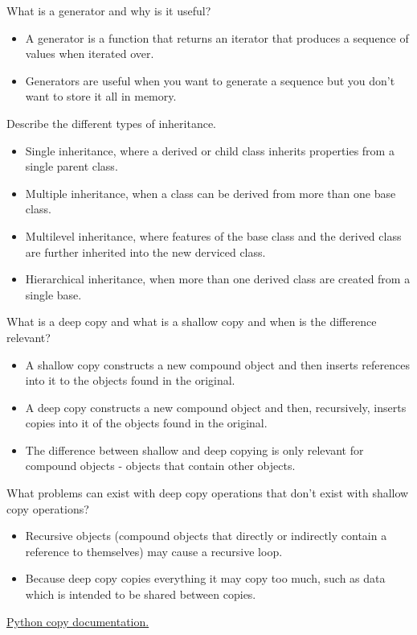 \begin{questions}
\question What is a generator and why is it useful?
\begin{solution}
\begin{itemize}
    \item A generator is a function that returns an iterator that produces a sequence of values when iterated over.
    \item Generators are useful when you want to generate a sequence but you don't want to store it all in memory.
\end{itemize}
\end{solution}

\question[4] Describe the different types of inheritance.
\begin{solution}
\begin{itemize}
    \item Single inheritance, where a derived or child class inherits properties from a single parent class.
    \item Multiple inheritance, when a class can be derived from more than one base class.
    \item Multilevel inheritance, where features of the base class and the derived class are further inherited into the new derviced class.
    \item Hierarchical inheritance, when more than one derived class are created from a single base.
\end{itemize}
\end{solution}

\question[3] What is a deep copy and what is a shallow copy and when is the difference relevant?
\begin{solution}
\begin{itemize}
    \item A shallow copy constructs a new compound object and then inserts references into it to the objects found in the original.
    \item A deep copy constructs a new compound object and then, recursively, inserts copies into it of the objects found in the original.
    \item The difference between shallow and deep copying is only relevant for compound objects - objects that contain other objects.
\end{itemize}
\end{solution}

\question[2] What problems can exist with deep copy operations that don't exist with shallow copy operations?
\begin{solution}
\begin{itemize}
    \item Recursive objects (compound objects that directly or indirectly contain a reference to themselves) may cause a recursive loop.
    \item Because deep copy copies everything it may copy too much, such as data which is intended to be shared between copies.
\end{itemize}
\href{https://docs.python.org/3/library/copy.html}{Python copy documentation.}
\end{solution}


\end{questions}
